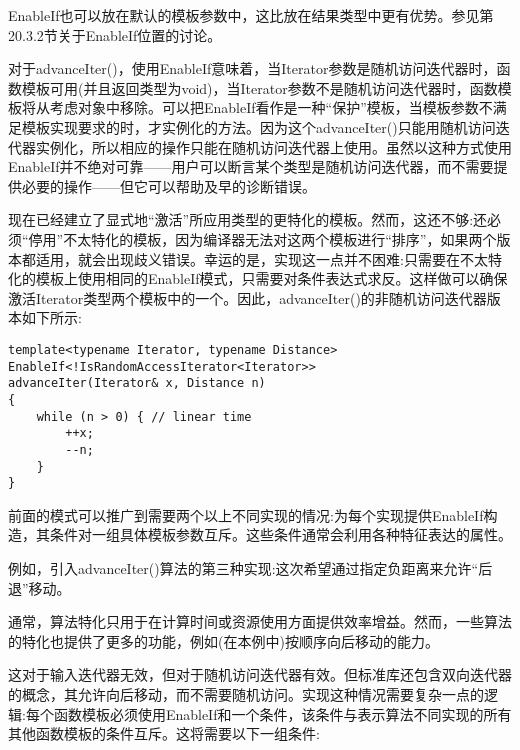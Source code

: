 \begin{tcolorbox}[colback=webgreen!5!white,colframe=webgreen!75!black]
\hspace*{0.75cm}EnableIf也可以放在默认的模板参数中，这比放在结果类型中更有优势。参见第20.3.2节关于EnableIf位置的讨论。
\end{tcolorbox}

对于advanceIter()，使用EnableIf意味着，当Iterator参数是随机访问迭代器时，函数模板可用(并且返回类型为void)，当Iterator参数不是随机访问迭代器时，函数模板将从考虑对象中移除。可以把EnableIf看作是一种“保护”模板，当模板参数不满足模板实现要求的时，才实例化的方法。因为这个advanceIter()只能用随机访问迭代器实例化，所以相应的操作只能在随机访问迭代器上使用。虽然以这种方式使用EnableIf并不绝对可靠——用户可以断言某个类型是随机访问迭代器，而不需要提供必要的操作——但它可以帮助及早的诊断错误。

现在已经建立了显式地“激活”所应用类型的更特化的模板。然而，这还不够:还必须“停用”不太特化的模板，因为编译器无法对这两个模板进行“排序”，如果两个版本都适用，就会出现歧义错误。幸运的是，实现这一点并不困难:只需要在不太特化的模板上使用相同的EnableIf模式，只需要对条件表达式求反。这样做可以确保激活Iterator类型两个模板中的一个。因此，advanceIter()的非随机访问迭代器版本如下所示:

\begin{lstlisting}[style=styleCXX]
template<typename Iterator, typename Distance>
EnableIf<!IsRandomAccessIterator<Iterator>>
advanceIter(Iterator& x, Distance n)
{
	while (n > 0) { // linear time
		++x;
		--n;
	}
}
\end{lstlisting}


前面的模式可以推广到需要两个以上不同实现的情况:为每个实现提供EnableIf构造，其条件对一组具体模板参数互斥。这些条件通常会利用各种特征表达的属性。

例如，引入advanceIter()算法的第三种实现:这次希望通过指定负距离来允许“后退”移动。

\begin{tcolorbox}[colback=webgreen!5!white,colframe=webgreen!75!black]
\hspace*{0.75cm}通常，算法特化只用于在计算时间或资源使用方面提供效率增益。然而，一些算法的特化也提供了更多的功能，例如(在本例中)按顺序向后移动的能力。
\end{tcolorbox}

这对于输入迭代器无效，但对于随机访问迭代器有效。但标准库还包含双向迭代器的概念，其允许向后移动，而不需要随机访问。实现这种情况需要复杂一点的逻辑:每个函数模板必须使用EnableIf和一个条件，该条件与表示算法不同实现的所有其他函数模板的条件互斥。这将需要以下一组条件:

